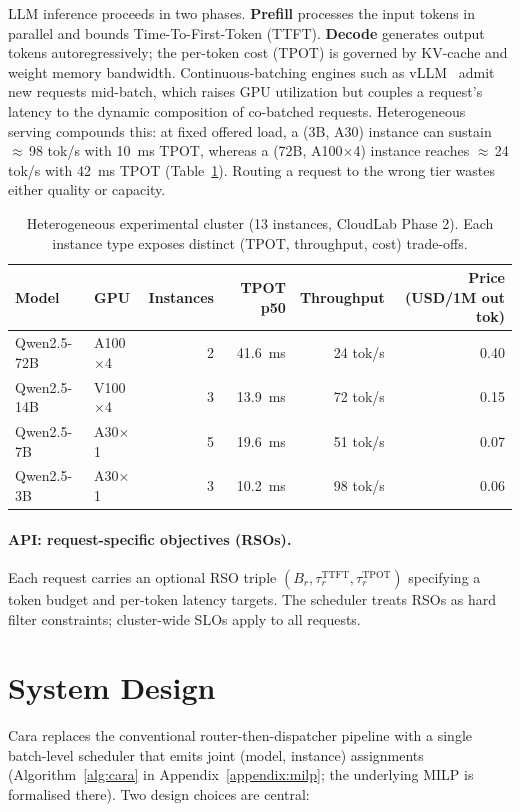 \documentclass[10pt]{article}
\begin{document}
LLM inference proceeds in two phases. \textbf{Prefill} processes the input tokens in parallel and bounds Time-To-First-Token (TTFT). \textbf{Decode} generates output tokens autoregressively; the per-token cost (TPOT) is governed by KV-cache and weight memory bandwidth. Continuous-batching engines such as vLLM~\cite{kwon2023vllm} admit new requests mid-batch, which raises GPU utilization but couples a request's latency to the dynamic composition of co-batched requests. Heterogeneous serving compounds this: at fixed offered load, a (3B, A30) instance can sustain $\approx$\,98 tok/s with 10~ms TPOT, whereas a (72B, A100$\times$4) instance reaches $\approx$\,24 tok/s with 42~ms TPOT (Table~\ref{tab:cluster}). Routing a request to the wrong tier wastes either quality or capacity.

\begin{table}[t]
\centering
\small
\caption{Heterogeneous experimental cluster (13 instances, CloudLab Phase 2). Each instance type exposes distinct (TPOT, throughput, cost) trade-offs.}
\label{tab:cluster}
\begin{tabular}{llrrrr}
\toprule
Model & GPU & Instances & TPOT p50 & Throughput & Price (USD/1M out tok) \\
\midrule
Qwen2.5-72B & A100$\times$4 & 2 & 41.6~ms & 24 tok/s & 0.40 \\
Qwen2.5-14B & V100$\times$4 & 3 & 13.9~ms & 72 tok/s & 0.15 \\
Qwen2.5-7B  & A30$\times$1  & 5 & 19.6~ms & 51 tok/s & 0.07 \\
Qwen2.5-3B  & A30$\times$1  & 3 & 10.2~ms & 98 tok/s & 0.06 \\
\bottomrule
\end{tabular}
\end{table}

\paragraph{API: request-specific objectives (RSOs).}
Each request carries an optional RSO triple $(B_r, \tau^{\text{TTFT}}_r, \tau^{\text{TPOT}}_r)$ specifying a token budget and per-token latency targets. The scheduler treats RSOs as hard filter constraints; cluster-wide SLOs apply to all requests.

\section{System Design}\label{sec:design}

Cara replaces the conventional router-then-dispatcher pipeline with a single batch-level scheduler that emits joint (model, instance) assignments (Algorithm~\ref{alg:cara} in Appendix~\ref{appendix:milp}; the underlying MILP is formalised there). Two design choices are central:
\end{document}
